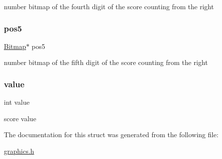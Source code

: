 number bitmap of the fourth digit of the score counting from the right 

\mbox{\label{struct_score_aeed79af9ec6da4c464f1e73574945399}} 
\subsubsection{\texorpdfstring{pos5}{pos5}}
{\footnotesize\ttfamily \hyperlink{struct_bitmap}{Bitmap}$\ast$ pos5}



number bitmap of the fifth digit of the score counting from the right 

\mbox{\label{struct_score_ac4f474c82e82cbb89ca7c36dd52be0ed}} 
\subsubsection{\texorpdfstring{value}{value}}
{\footnotesize\ttfamily int value}



score value 



The documentation for this struct was generated from the following file\+:\begin{DoxyCompactItemize}
\item 
\hyperlink{graphics_8h}{graphics.\+h}\end{DoxyCompactItemize}
